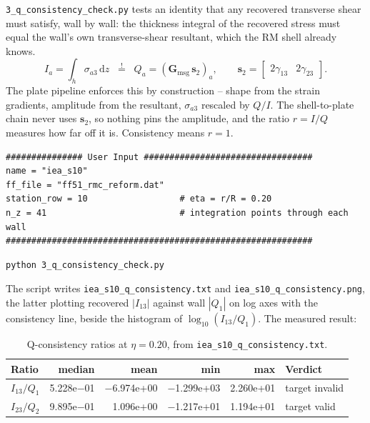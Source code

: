 \texttt{3\_q\_consistency\_check.py} tests an identity that any recovered
transverse shear must satisfy, wall by wall: the thickness integral of the
recovered stress must equal the wall's own transverse-shear resultant, which the
RM shell already knows.
\[
  I_a = \int_h \sigma_{a3}\,\mathrm{d}z
  \;\;\overset{!}{=}\;\;
  Q_a = \left(\mathbf{G}_{\mathrm{msg}}\,\mathbf{s}_2\right)_a ,
  \qquad
  \mathbf{s}_2 = \begin{bmatrix} 2\gamma_{13} & 2\gamma_{23}\end{bmatrix}.
\]
The plate pipeline enforces this by construction -- shape from the strain
gradients, amplitude from the resultant, $\sigma_{a3}$ rescaled by $Q/I$. The
shell-to-plate chain never uses $\mathbf{s}_2$, so nothing pins the amplitude,
and the ratio $r = I/Q$ measures how far off it is. Consistency means $r = 1$.

\begin{lstlisting}[style=opensg]
############### User Input #################################
name = "iea_s10"
ff_file = "ff51_rmc_reform.dat"
station_row = 10                  # eta = r/R = 0.20
n_z = 41                          # integration points through each wall
############################################################
\end{lstlisting}

\begin{lstlisting}[style=shellst]
python 3_q_consistency_check.py
\end{lstlisting}

The script writes \texttt{iea\_s10\_q\_consistency.txt} and
\texttt{iea\_s10\_q\_consistency.png}, the latter plotting recovered $|I_{13}|$
against wall $|Q_1|$ on log axes with the consistency line, beside the histogram
of $\log_{10}(I_{13}/Q_1)$. The measured result:

\begin{table}[htbp]
\centering
\small
\caption{Q-consistency ratios at $\eta = 0.20$, from
         \texttt{iea\_s10\_q\_consistency.txt}.}
\label{tab:windio:qcheck}
\begin{tabular}{lrrrrl}
\toprule
Ratio & median & mean & min & max & Verdict \\
\midrule
$I_{13}/Q_1$ & 5.228e$-$01 & $-$6.974e+00 & $-$1.299e+03 & 2.260e+01 & target invalid \\
$I_{23}/Q_2$ & 9.895e$-$01 & 1.096e+00 & $-$1.217e+01 & 1.194e+01 & target valid \\
\bottomrule
\end{tabular}
\end{table}

